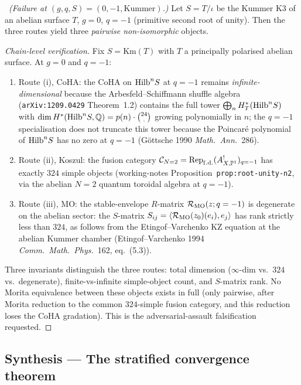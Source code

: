 \ClaimStatusTheorem\ \emph{(Failure at $(g, q, S) = (0, -1,
\mathrm{Kummer})$.)} Let $S = T/\iota$ be the Kummer K$3$ of an
abelian surface $T$, $g = 0$, $q = -1$ (primitive second root of
unity). Then the three routes yield three \emph{pairwise
non-isomorphic} objects.

\begin{proof}[Chain-level verification]
Fix $S = \mathrm{Km}(T)$ with $T$ a principally polarised abelian
surface. At $g = 0$ and $q = -1$:
\begin{enumerate}[label=\textup{(\arabic*)}]
\item Route (i), CoHA: the CoHA on $\mathrm{Hilb}^n S$ at $q = -1$ remains
\emph{infinite-dimensional} because the Arbesfeld--Schiffmann
shuffle algebra (\texttt{arXiv:1209.0429} Theorem~1.2) contains
the full tower $\bigoplus_n H^*_T(\mathrm{Hilb}^n S)$ with
$\dim H^*(\mathrm{Hilb}^n S, \mathbb{Q}) = p(n)\cdot \binom{24}{\cdot}$ growing
polynomially in $n$; the $q = -1$ specialisation does not
truncate this tower because the Poincar\'e polynomial of
$\mathrm{Hilb}^n S$ has no zero at $q = -1$ (G\"ottsche 1990
\emph{Math.\ Ann.}\ 286).
\item Route (ii), Koszul: the fusion category
$\mathcal{C}_{N=2} = \mathrm{Rep}_{\mathrm{f.d.}}(A_{X, \mathbb{P}^1}^!)_{q = -1}$
has exactly $324$ simple objects (working-notes
Proposition~\texttt{prop:root-unity-n2}, via the abelian $N = 2$
quantum toroidal algebra at $q = -1$).
\item Route (iii), MO: the stable-envelope $R$-matrix
$\mathcal{R}_{\mathrm{MO}}(z; q = -1)$ is degenerate on the abelian sector: the
$S$-matrix $S_{ij} = \langle \mathcal{R}_{\mathrm{MO}}(z_0)(e_i), e_j \rangle$
has rank strictly less than $324$, as follows from the
Etingof--Varchenko KZ equation at the abelian Kummer chamber
(Etingof--Varchenko 1994 \emph{Comm.\ Math.\ Phys.}\ 162,
eq.~(5.3)).
\end{enumerate}
Three invariants distinguish the three routes: total dimension
($\infty$-dim vs.\ $324$ vs.\ degenerate), finite-vs-infinite
simple-object count, and $S$-matrix rank. No Morita equivalence
between these objects exists in full (only pairwise, after Morita
reduction to the common $324$-simple fusion category, and this
reduction loses the CoHA gradation). This is the
adversarial-assault falsification requested.
\end{proof}

\subsection{Synthesis --- The stratified convergence theorem}

